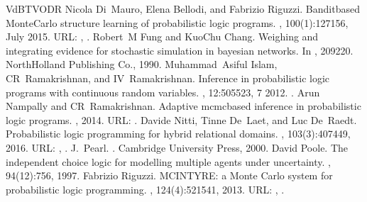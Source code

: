 \documentclass[letterpaper,10pt,english]{sphinxmanual}
\begin{document}
\begin{sphinxthebibliography}{VdBTVODR}
\sphinxAtStartPar
Nicola Di Mauro, Elena Bellodi, and Fabrizio Riguzzi. Bandit\sphinxhyphen{}based Monte\sphinxhyphen{}Carlo structure learning of probabilistic logic programs. , 100(1):127\textendash{}156, July 2015. URL: , .
\sphinxAtStartPar
Robert M Fung and Kuo\sphinxhyphen{}Chu Chang. Weighing and integrating evidence for stochastic simulation in bayesian networks. In , 209\textendash{}220. North\sphinxhyphen{}Holland Publishing Co., 1990.
\sphinxAtStartPar
Muhammad Asiful Islam, CR Ramakrishnan, and IV Ramakrishnan. Inference in probabilistic logic programs with continuous random variables. , 12:505\textendash{}523, 7 2012. .
\sphinxAtStartPar
Arun Nampally and CR Ramakrishnan. Adaptive mcmc\sphinxhyphen{}based inference in probabilistic logic programs. , 2014. URL: .
\sphinxAtStartPar
Davide Nitti, Tinne De Laet, and Luc De Raedt. Probabilistic logic programming for hybrid relational domains. , 103(3):407\textendash{}449, 2016. URL: , .
\sphinxAtStartPar
J. Pearl. . Cambridge University Press, 2000.
\sphinxAtStartPar
David Poole. The independent choice logic for modelling multiple agents under uncertainty. , 94(1\sphinxhyphen{}2):7\textendash{}56, 1997.
\sphinxAtStartPar
Fabrizio Riguzzi. MCINTYRE: a Monte Carlo system for probabilistic logic programming. , 124(4):521\textendash{}541, 2013. URL: , .

\end{sphinxthebibliography}
\end{document}
